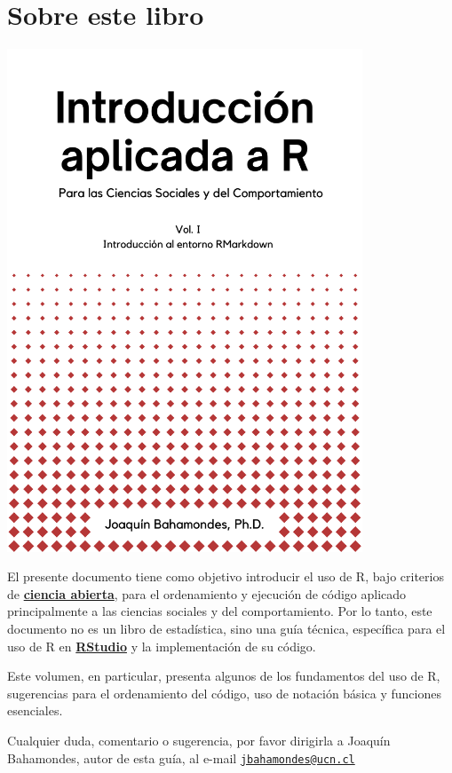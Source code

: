 \documentclass[
]{book}
\author{}
\date{\vspace{-2.5em}}
\begin{document}
{
\setcounter{tocdepth}{1}
\tableofcontents
}
\chapter*{Sobre este libro}\label{sobre-este-libro}

\includegraphics[width=4.16667in,height=\textheight]{_bookdown_files/images/1.png}

El presente documento tiene como objetivo introducir el uso de R, bajo criterios de \href{https://es.wikipedia.org/wiki/Ciencia_abierta}{\textbf{ciencia abierta}}, para el ordenamiento y ejecución de código aplicado principalmente a las ciencias sociales y del comportamiento. Por lo tanto, este documento no es un libro de estadística, sino una guía técnica, específica para el uso de R en \href{https://posit.co/download/rstudio-desktop/}{\textbf{RStudio}} y la implementación de su código.

Este volumen, en particular, presenta algunos de los fundamentos del uso de R, sugerencias para el ordenamiento del código, uso de notación básica y funciones esenciales.

Cualquier duda, comentario o sugerencia, por favor dirigirla a Joaquín Bahamondes, autor de esta guía, al e-mail \href{mailto:jbahamondes@ucn.cl}{\nolinkurl{jbahamondes@ucn.cl}}
\end{document}
